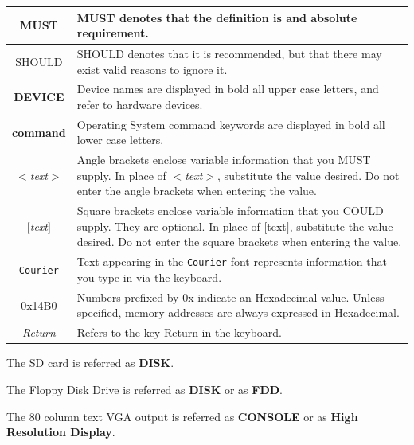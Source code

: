 \documentclass[a4paper,11pt]{article}
\begin{document}
    \begin{center}
        \begin{tabular}{c m{9cm}}
            \hline
            MUST & MUST denotes that the definition is and absolute
            requirement.\\
            \hline
            SHOULD & SHOULD denotes that it is recommended, but that there may
            exist valid reasons to ignore it.\\
            \hline
            \textbf{DEVICE} & Device names are displayed in bold all upper case 
            letters, and refer to hardware devices.\\
            \hline
            \textbf{command} & Operating System command keywords are displayed 
            in bold all lower case letters.\\
            \hline
            \textit{$<$text$>$} & Angle brackets enclose variable information 
            that you MUST supply. In place of \textit{$<$text$>$}, substitute 
            the value desired. Do not enter the angle brackets when entering the
            value.\\
            \hline
            \textit{$[$text$]$} & Square brackets enclose variable information
            that you COULD supply. They are optional. In place of $[$text$]$,
            substitute the value desired. Do not enter the square brackets when
            entering the value.\\
            \hline
            \texttt{Courier} & Text appearing in the \texttt{Courier} font 
            represents information that you type in via the keyboard.\\
            \hline
            0x14B0 & Numbers prefixed by 0x indicate an Hexadecimal value.
            Unless specified, memory addresses are always expressed in
            Hexadecimal.\\
            \hline
            \textit{Return} & Refers to the key Return in the keyboard.\\
            \hline
        \end{tabular}
    \end{center}

    The SD card is referred as \textbf{DISK}.

    The Floppy Disk Drive is referred as \textbf{DISK} or as \textbf{FDD}.

    The 80 column text VGA output is referred as \textbf{CONSOLE} or as
    \textbf{High Resolution Display}.
\end{document}
